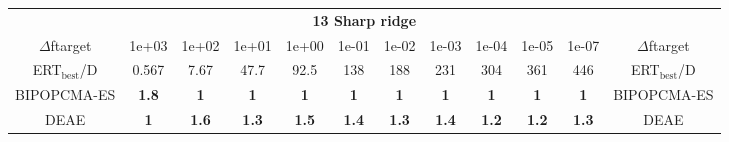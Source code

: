 \begin{tabular}{cccccccccccc}
 & \multicolumn{10}{c}{{\normalsize \textbf{13 Sharp ridge}}}\\
$\Delta$ftarget& 1e+03& 1e+02& 1e+01& 1e+00& 1e-01& 1e-02& 1e-03& 1e-04& 1e-05& 1e-07 & $\Delta$ftarget \\
ERT$_{\textrm{best}}$/D& 0.567& 7.67& 47.7& 92.5& 138& 188& 231& 304& 361& 446 & ERT$_{\textrm{best}}$/D \\
\hline
BIPOPCMA-ES & \textbf{1.8} & \textbf{1} & \textbf{1} & \textbf{1} & \textbf{1} & \textbf{1} & \textbf{1} & \textbf{1} & \textbf{1} & \textbf{1} & BIPOPCMA-ES \cite{add_an_entry_for_BIPOPCMA-ES_in_bbob.bib}\\
DEAE & \textbf{1} & \textbf{1.6} & \textbf{1.3} & \textbf{1.5} & \textbf{1.4} & \textbf{1.3} & \textbf{1.4} & \textbf{1.2} & \textbf{1.2} & \textbf{1.3} & DEAE \cite{add_an_entry_for_DEAE_in_bbob.bib}
\end{tabular}
